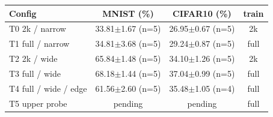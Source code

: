 \begin{tabular}{lccc}\hline
Config & MNIST (\%) & CIFAR10 (\%) & train \\\hline
T0 2k / narrow & 33.81$\pm$1.67 (n=5) & 26.95$\pm$0.67 (n=5) & 2k \\
T1 full / narrow & 34.81$\pm$3.68 (n=5) & 29.24$\pm$0.87 (n=5) & full \\
T2 2k / wide & 65.84$\pm$1.48 (n=5) & 34.10$\pm$1.26 (n=5) & 2k \\
T3 full / wide & 68.18$\pm$1.44 (n=5) & 37.04$\pm$0.99 (n=5) & full \\
T4 full / wide / edge & 61.56$\pm$2.60 (n=5) & 35.48$\pm$1.05 (n=4) & full \\
T5 upper probe & pending & pending & full \\
\hline\end{tabular}
